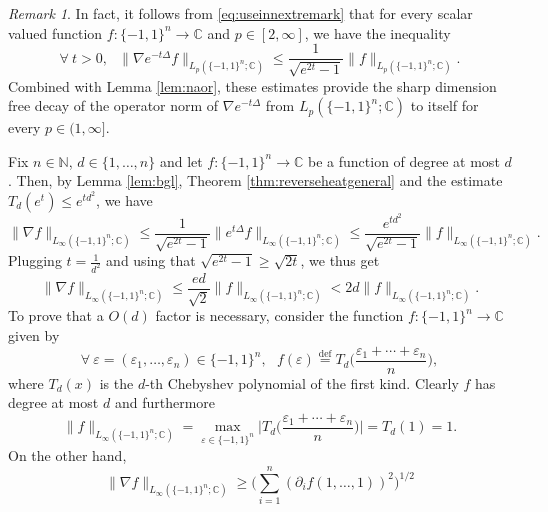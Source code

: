 \documentclass[11pt,reqno]{amsart}
\renewcommand{\leq}{\leqslant}
\renewcommand{\geq}{\geqslant}
\newcommand{\e}{\varepsilon}
\newcommand{\1}{\mathbf 1}
\theoremstyle{remark}
\newtheorem{remark}[theorem]{Remark}
\newcommand{\C}{\mathbb C}
\newcommand{\N}{\mathbb N}
\newcommand{\eqdef}{\stackrel{\mathrm{def}}{=}}
\begin{document}
\begin{remark}
In fact, it follows from \eqref{eq:useinnextremark} that for every scalar valued function $f:\{-1,1\}^n\to\C$ and $p\in[2,\infty]$, we have the inequality
\begin{equation}
\forall \ t>0,  \ \ \ \|\nabla e^{-t\Delta} f\|_{L_p(\{-1,1\}^n;\C)} \leq \frac{1}{\sqrt{e^{2t}-1}} \|f\|_{L_p(\{-1,1\}^n;\C)}.
\end{equation}
Combined with Lemma \ref{lem:naor}, these estimates provide the sharp dimension free decay of the operator norm of $\nabla e^{-t\Delta}$ from $L_p(\{-1,1\}^n;\C)$ to itself for every $p\in(1,\infty]$.
\end{remark}

\medskip

Fix $n\in\N$, $d\in\{1,\ldots,n\}$ and let $f:\{-1,1\}^n\to \C$ be a function of degree at most $d$. Then, by Lemma \ref{lem:bgl}, Theorem \ref{thm:reverseheatgeneral} and the estimate $T_d(e^t)\leq e^{td^2}$, we have
\begin{equation}
\|\nabla f\|_{L_\infty(\{-1,1\}^n;\C)} \leq \frac{1}{\sqrt{e^{2t}-1}} \|e^{t\Delta}f\|_{L_\infty(\{-1,1\}^n;\C)} \leq \frac{e^{td^2}}{\sqrt{e^{2t}-1}} \|f\|_{L_\infty(\{-1,1\}^n;\C)}.
\end{equation}
Plugging $t=\frac{1}{d^2}$ and using that $\sqrt{e^{2t}-1} \geq \sqrt{2t}$, we thus get
\begin{equation}
\|\nabla f\|_{L_\infty(\{-1,1\}^n;\C)} \leq \frac{ed}{\sqrt{2}} \|f\|_{L_\infty(\{-1,1\}^n;\C)} < 2d\|f\|_{L_\infty(\{-1,1\}^n;\C)}.
\end{equation}
To prove that a $O(d)$ factor is necessary, consider the function $f:\{-1,1\}^n\to\C$ given by
\begin{equation}
\forall \ \e=(\e_1,\ldots,\e_n)\in\{-1,1\}^n, \ \ \ f(\e) \eqdef T_d\Big(\frac{\e_1+\cdots+\e_n}{n}\Big),
\end{equation}
where $T_d(x)$ is the $d$-th Chebyshev polynomial of the first kind. Clearly $f$ has degree at most $d$ and furthermore
\begin{equation}
\|f\|_{L_\infty(\{-1,1\}^n;\C)} = \max_{\e\in\{-1,1\}^n} \Big| T_d\Big(\frac{\e_1+\cdots+\e_n}{n}\Big)\Big| = T_d(1)=1.
\end{equation}
On the other hand,
\begin{equation}
\|\nabla f\|_{L_\infty(\{-1,1\}^n;\C)} \geq \Big( \sum_{i=1}^n (\partial_if(1,\ldots,1))^2\Big)^{1/2}
\end{equation}
\end{document}
